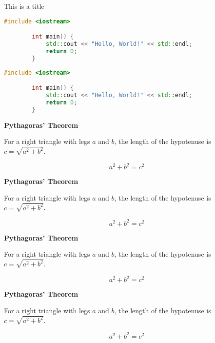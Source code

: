 \begin{multicols}{2}
    \begin{codebox}{This is a title}
        \begin{lstlisting}[language=C++]
        #include <iostream>

        int main() {
            std::cout << "Hello, World!" << std::endl;
            return 0;
        }
    \end{lstlisting}
    \end{codebox}

    \begin{lstlisting}[language=C++]
        #include <iostream>

        int main() {
            std::cout << "Hello, World!" << std::endl;
            return 0;
        }
\end{lstlisting}

    \begin{theorem}
        \textbf{Pythagoras' Theorem}

        For a right triangle with legs $a$ and $b$, the length of the hypotenuse is
        $c = \sqrt{a^2 + b^2}$.

        \begin{equation*}
            a^2 + b^2 = c^2
        \end{equation*}
    \end{theorem}

    \begin{lemma}
        \textbf{Pythagoras' Theorem}

        For a right triangle with legs $a$ and $b$, the length of the hypotenuse is
        $c = \sqrt{a^2 + b^2}$.

        \begin{equation*}
            a^2 + b^2 = c^2
        \end{equation*}
    \end{lemma}

    \begin{corollary}
        \textbf{Pythagoras' Theorem}

        For a right triangle with legs $a$ and $b$, the length of the hypotenuse is
        $c = \sqrt{a^2 + b^2}$.

        \begin{equation*}
            a^2 + b^2 = c^2
        \end{equation*}
    \end{corollary}

    \begin{proposition}
        \textbf{Pythagoras' Theorem}

        For a right triangle with legs $a$ and $b$, the length of the hypotenuse is
        $c = \sqrt{a^2 + b^2}$.

        \begin{equation*}
            a^2 + b^2 = c^2
        \end{equation*}
    \end{proposition}
\end{multicols}
